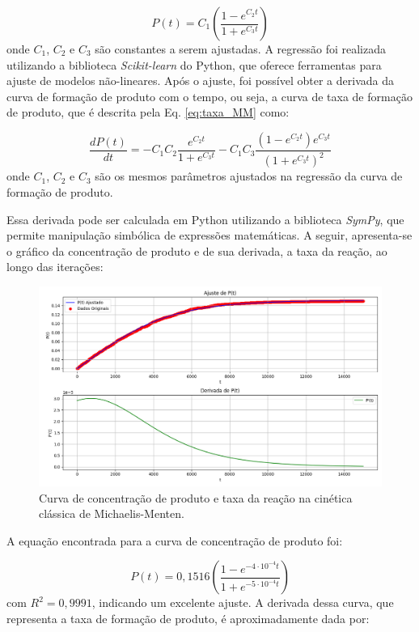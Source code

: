\documentclass[12pt,oneside]{report}
\begin{document}
\begin{equation}
    \label{eq:produto_MM}
    P(t) = C_1 \left(\frac{1 - e^{C_2 t}}{1 + e^{C_3 t}}\right)
\end{equation}
onde $C_1$, $C_2$ e $C_3$ são constantes a serem ajustadas. A regressão foi realizada utilizando a biblioteca \textit{Scikit-learn} do Python, que oferece ferramentas para ajuste de modelos não-lineares. Após o ajuste, foi possível obter a derivada da curva de formação de produto com o tempo, ou seja, a curva de taxa de formação de produto, que é descrita pela Eq. \ref{eq:taxa_MM} como:

\begin{equation}
    \label{eq:taxa_MM}
    \frac{dP(t)}{dt} = -C_1 C_2 \frac{e^{C_2 t}}{1 + e^{C_3 t}} - C_1 C_3 \frac{(1 - e^{C_2 t}) e^{C_3 t}}{(1 + e^{C_3 t})^2}
\end{equation}
onde $C_1$, $C_2$ e $C_3$ são os mesmos parâmetros ajustados na regressão da curva de formação de produto.

Essa derivada pode ser calculada em Python utilizando a biblioteca \textit{SymPy}, que permite manipulação simbólica de expressões matemáticas. A seguir, apresenta-se o gráfico da concentração de produto e de sua derivada, a taxa da reação, ao longo das iterações:

\begin{figure}[H]
    \centering
    \includegraphics[width=1\textwidth]{img/MM_rate.png}
    \caption{\small Curva de concentração de produto e taxa da reação na cinética clássica de Michaelis-Menten.}
    \label{fig:MM_rate}
\end{figure}

A equação encontrada para a curva de concentração de produto foi:

\begin{equation}
    P(t) = 0{,}1516 \left(\frac{1 - e^{-4 \cdot 10^{-4} t}}{1 + e^{-5 \cdot 10^{-4} t}}\right)
\end{equation}
com $R^2 = 0{,}9991$, indicando um excelente ajuste. A derivada dessa curva, que representa a taxa de formação de produto, é aproximadamente dada por:
\end{document}
